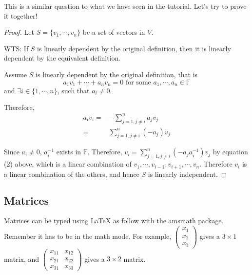 \documentclass{article}
\newcommand{\Sum}{\displaystyle\sum} %
\begin{document}
This is a similar question to what we have seen in the tutorial. Let's try to prove it together!

\begin{proof} %
Let $S = \{ v_1, \cdots, v_n\}$ be a set of vectors in $V$.

WTS: If $S$ is linearly dependent by the original definition, then it is linearly dependent by the equivalent definition.

Assume $S$ is linearly dependent by the original definition, that is
$$
a_1 v_1 + \cdots + a_n v_n = 0 \text{ for some } a_1, \cdots, a_n \in \mathbb{F}
$$
and $\exists i \in \{ 1, \cdots, n \}$, such that $a_i \neq 0$.

Therefore,
\begin{align} %
    a_i v_i =& - \Sum_{j=1, j \neq i}^{n} a_j v_j \\ 
            =& \Sum_{j=1, j \neq i}^{n} (-a_j) v_j
\end{align}


Since $a_i \neq 0$, $a_i^{-1}$ exists in $\mathbb{F}$. Therefore, 
$v_i = \Sum_{j=1, j \neq i}^{n} (-a_j a_i^{-1}) v_j$ by equation (2) above, which is a linear combination of $v_1, \cdots, v_{i-1}, v_{i+1}, \cdots, v_n$. Therefore $v_i$ is a linear combination of the others, and hence $S$ is linearly independent.

\end{proof}

\subsection{Matrices}

Matrices can be typed using LaTeX as follow with the amsmath package. Remember it has to be in the math mode. For example,
$
\begin{pmatrix}
x_1 \\ x_2 \\ x_3
\end{pmatrix}
$
gives a $3 \times 1$ matrix, and
$
\begin{pmatrix}
x_{11} & x_{12} \\ x_{21} & x_{22} \\ x_{31} & x_{33}
\end{pmatrix}
$
gives a $3 \times 2$ matrix.
\end{document}
